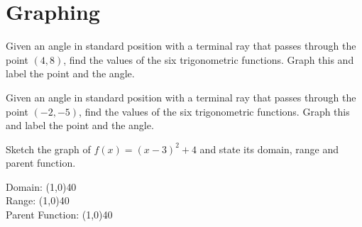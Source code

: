 \documentclass[addpoints]{exam}
\begin{document}
\section*{Graphing}
    \begin{questions}
    \setcounter{question}{71}
    \question[1] Given an angle in standard position with a terminal ray that passes through the point $(4,8)$, find the values of the six trigonometric functions. Graph this and label the point and the angle.

        \begin{left} 
        \end{left} 
        
    \question[1] Given an angle in standard position with a terminal ray that passes through the point $(-2,-5)$, find the values of the six trigonometric functions. Graph this and label the point and the angle.

        \begin{left} 
        \end{left} 
    
    
    \question[1] Sketch the graph of $f(x) = (x-3)^2 + 4$ and state its domain, range and parent function.
    
        \begin{left} 
        \end{left}
        
    Domain: \line(1,0){40} \\
    \newline
    Range: \line(1,0){40} \\
    \newline
    Parent Function: \line(1,0){40} \\
    

\end{questions}
\end{document}
